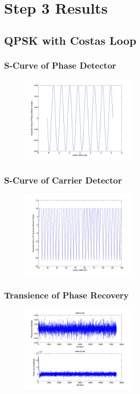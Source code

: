 \documentclass[]{article}
\begin{document}
\section{Step 3 Results}
\subsection{QPSK with Costas Loop}

\subsubsection{S-Curve of Phase Detector}
\begin{figure}[H]
\centering
\hspace*{-2cm}\includegraphics[width=0.5\textwidth]{qpScurvepo_costas.jpg}
\caption{}
\end{figure}
\subsubsection{S-Curve of Carrier Detector}
\begin{figure}[H]
\centering
\hspace*{-2cm}\includegraphics[width=0.5\textwidth]{qpScurvefo.jpg}
\caption{}
\end{figure}
\subsubsection{Transience of Phase Recovery}
\begin{figure}[H]
\centering
\hspace*{-2cm}\includegraphics[width=0.5\textwidth]{qpLoopFilterpo_costas1.jpg}
\caption{}
\end{figure}
\end{document}
